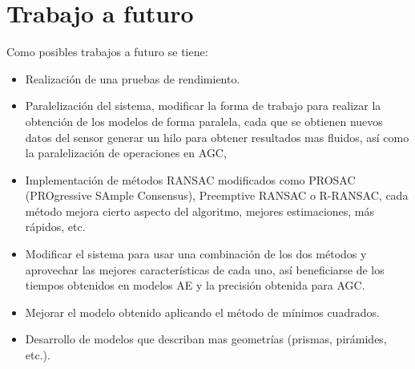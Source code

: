 

\section{Trabajo a futuro}

Como posibles trabajos a futuro se tiene:


\begin{itemize}
	\item Realización de una pruebas de rendimiento.
	\item Paralelización del sistema, modificar la forma de trabajo para realizar la obtención de los modelos de forma paralela, cada que se obtienen nuevos datos del sensor generar un hilo para obtener resultados mas fluidos, así como la paralelización de operaciones en AGC,
	\item Implementación de métodos RANSAC modificados como PROSAC (PROgressive SAmple Consensus), Preemptive RANSAC o R-RANSAC, cada método mejora cierto aspecto del algoritmo, mejores estimaciones, más rápidos, etc. 
	\item Modificar el sistema para usar una combinación de los dos métodos y aprovechar las mejores características de cada uno, así beneficiarse de los tiempos obtenidos en modelos AE y la precisión obtenida para AGC.
	\item Mejorar el modelo obtenido aplicando el método de mínimos cuadrados.
	\item Desarrollo de modelos que describan mas geometrías (prismas, pirámides, etc.).
	
\end{itemize}

